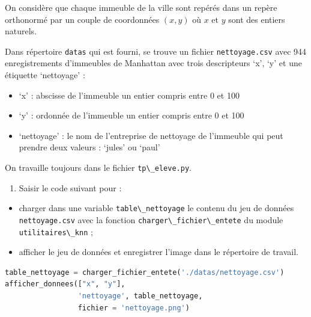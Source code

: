 \documentclass[
  11pt,
]{article}
\newcommand{\passthrough}[1]{#1}
\providecommand{\tightlist}{%
  \setlength{\itemsep}{0pt}\setlength{\parskip}{0pt}}
\newcounter{def}
\begin{document}
On considère que chaque immeuble de la ville sont repérés dans un repère
orthonormé par un couple de coordonnées \((x, y)\) où \(x\) et \(y\)
sont des entiers naturels.

Dans répertoire \passthrough{\lstinline!datas!} qui est fourni, se
trouve un fichier \passthrough{\lstinline!nettoyage.csv!} avec 944
enregistrements d'immeubles de Manhattan avec trois descripteurs `x',
`y' et une étiquette `nettoyage' :

\begin{itemize}
\tightlist
\item
  `x' : abscisse de l'immeuble un entier compris entre 0 et 100
\item
  `y' : ordonnée de l'immeuble un entier compris entre 0 et 100
\item
  `nettoyage' : le nom de l'entreprise de nettoyage de l'immeuble qui
  peut prendre deux valeurs : `jules' ou `paul'
\end{itemize}

On travaille toujours dans le fichier
\passthrough{\lstinline!tp\_eleve.py!}.

\begin{enumerate}
\def\labelenumi{\arabic{enumi}.}
\tightlist
\item
  Saisir le code suivant pour :
\end{enumerate}

\begin{itemize}
\tightlist
\item
  charger dans une variable \passthrough{\lstinline!table\_nettoyage!}
  le contenu du jeu de données \passthrough{\lstinline!nettoyage.csv!}
  avec la fonction \passthrough{\lstinline!charger\_fichier\_entete!} du
  module \passthrough{\lstinline!utilitaires\_knn!} ;
\item
  afficher le jeu de données et enregistrer l'image dans le répertoire
  de travail.
\end{itemize}

\begin{lstlisting}[language=Python]
table_nettoyage = charger_fichier_entete('./datas/nettoyage.csv')
afficher_donnees(["x", "y"], 
                 'nettoyage', table_nettoyage, 
                 fichier = 'nettoyage.png')
\end{lstlisting}
\end{document}
